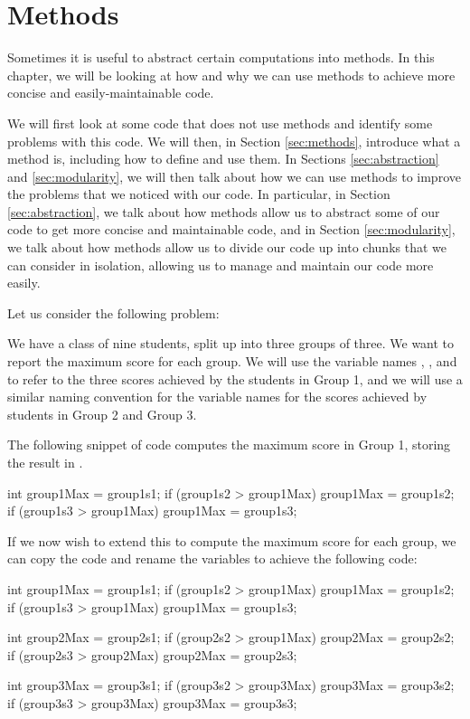 \chapter{Methods}


Sometimes it is useful to abstract certain computations into methods.
In this chapter, we will be looking at how and why we can use methods to
achieve more concise and easily-maintainable code.

We will first look at some code that does not use methods and identify some
problems with this code. We will then, in Section \ref{sec:methods},
introduce what a method is, including how to define and use them.
In Sections \ref{sec:abstraction} and \ref{sec:modularity}, we will
then talk about how we can use methods to improve the problems that
we noticed with our code. In particular, in Section \ref{sec:abstraction},
we talk about how methods allow us to abstract some of our code to get
more concise and maintainable code, and in Section \ref{sec:modularity},
we talk about how methods allow us to divide our code up into chunks
that we can consider in isolation, allowing us to manage and maintain
our code more easily.

Let us consider the following problem:

We have a class of nine students, split up into three groups of three.
We want to report the maximum score for each group.
We will use the variable names , , and 
to refer to the three scores achieved by the students in Group 1, and we will use
a similar naming convention for the variable names for the scores achieved by
students in Group 2 and Group 3.

The following snippet of code computes the maximum score in Group 1, storing
the result in .
\begin{code}
int group1Max = group1s1;
if (group1s2 > group1Max) {
  group1Max = group1s2; 
}
if (group1s3 > group1Max) {
  group1Max = group1s3; 
}
\end{code}

If we now wish to extend this to compute the maximum score for each group,
we can copy the code and rename the variables to achieve the following
code:
\begin{code}
int group1Max = group1s1;
if (group1s2 > group1Max) {
  group1Max = group1s2; 
}
if (group1s3 > group1Max) {
  group1Max = group1s3; 
}

int group2Max = group2s1;
if (group2s2 > group1Max) {
  group2Max = group2s2; 
}
if (group2s3 > group2Max) {
  group2Max = group2s3; 
}

int group3Max = group3s1;
if (group3s2 > group3Max) {
  group3Max = group3s2; 
}
if (group3s3 > group3Max) {
  group3Max = group3s3; 
}
\end{code}

